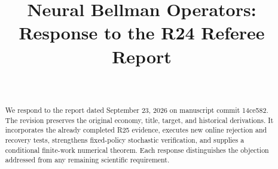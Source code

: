

\begin{frontmatter}
\title{Neural Bellman Operators:\\Response to the R24 Referee Report}
\begin{aug}\author[id=au1,addressref={add1}]{~}\address[id=add1]{}\end{aug}
\begin{abstract}We respond to the report dated September 23, 2026 on manuscript commit 14ce582. The revision preserves the original economy, title, target, and historical derivations. It incorporates the already completed R25 evidence, executes new online rejection and recovery tests, strengthens fixed-policy stochastic verification, and supplies a conditional finite-work numerical theorem. Each response distinguishes the objection addressed from any remaining scientific requirement.\end{abstract}
\end{frontmatter}



